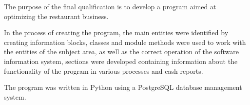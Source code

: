 The purpose of the final qualification is to develop a program aimed at optimizing the restaurant business.

In the process of creating the program, the main entities were identified by creating information blocks, classes and module methods were used to work with the entities of the subject area, as well as the correct operation of the software information system, sections were developed containing information about the functionality of the program in various processes and cash reports.

The program was written in Python using a PostgreSQL database management system.
